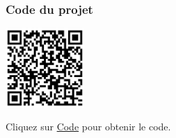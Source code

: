 \documentclass[a4paper,12pt]{report}
\begin{document}
\subsubsection{Code du projet}

\begin{minipage}{0.5\textwidth}
    \includegraphics[height=3cm]{Code TC303.png}
\end{minipage}%
\begin{minipage}{0.5\textwidth}
    Cliquez sur \href{https://github.com/DexterTaha/Controllino-PLC-Sample/blob/main/TC300/TC303_Grue/TC303_Grue.ino}{Code} pour obtenir le code.
\end{minipage}

\newpage
\end{document}
